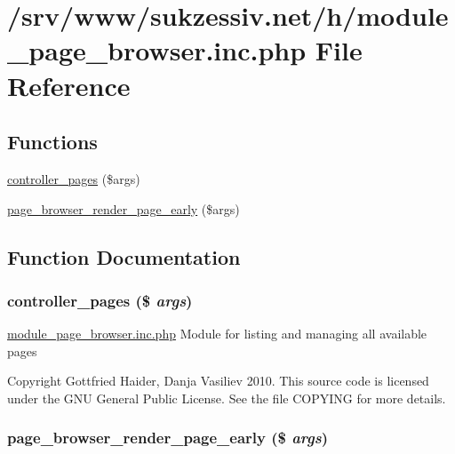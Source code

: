 \hypertarget{module__page__browser_8inc_8php}{
\section{/srv/www/sukzessiv.net/h/module\_\-page\_\-browser.inc.php File Reference}
\label{module__page__browser_8inc_8php}
}
\subsection*{Functions}
\begin{CompactItemize}
\item 
\hyperlink{module__page__browser_8inc_8php_7e937f92734b69829f9d3ab5e00f14e0}{controller\_\-pages} (\$args)
\item 
\hyperlink{module__page__browser_8inc_8php_a94d17bbea100ee50f09c7bf4094a1db}{page\_\-browser\_\-render\_\-page\_\-early} (\$args)
\end{CompactItemize}


\subsection{Function Documentation}
\hypertarget{module__page__browser_8inc_8php_7e937f92734b69829f9d3ab5e00f14e0}{
\subsubsection[{controller\_\-pages}]{\setlength{\rightskip}{0pt plus 5cm}controller\_\-pages (\$ {\em args})}}
\label{module__page__browser_8inc_8php_7e937f92734b69829f9d3ab5e00f14e0}


\hyperlink{module__page__browser_8inc_8php}{module\_\-page\_\-browser.inc.php} Module for listing and managing all available pages

Copyright Gottfried Haider, Danja Vasiliev 2010. This source code is licensed under the GNU General Public License. See the file COPYING for more details. \hypertarget{module__page__browser_8inc_8php_a94d17bbea100ee50f09c7bf4094a1db}{
\subsubsection[{page\_\-browser\_\-render\_\-page\_\-early}]{\setlength{\rightskip}{0pt plus 5cm}page\_\-browser\_\-render\_\-page\_\-early (\$ {\em args})}}
\label{module__page__browser_8inc_8php_a94d17bbea100ee50f09c7bf4094a1db}


